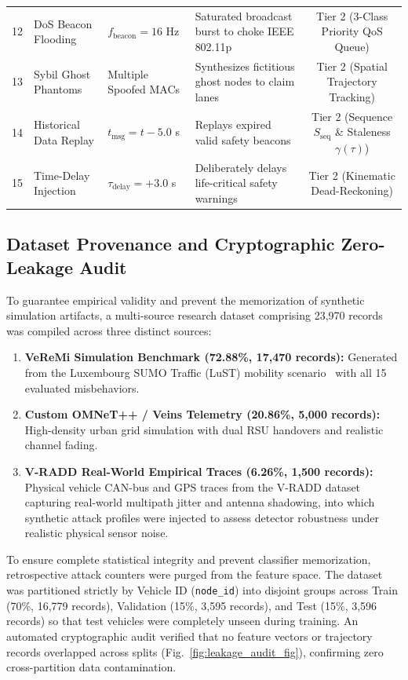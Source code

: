 \documentclass[conference]{IEEEtran}
\begin{document}
\begin{table}[t]
{\begin{tabular}{clp{3.8cm}p{6.0cm}c}
12 & DoS Beacon Flooding & $f_{\text{beacon}} = 16$ Hz & Saturated broadcast burst to choke IEEE 802.11p & Tier 2 (3-Class Priority QoS Queue) \\
13 & Sybil Ghost Phantoms & Multiple Spoofed MACs & Synthesizes fictitious ghost nodes to claim lanes & Tier 2 (Spatial Trajectory Tracking) \\
14 & Historical Data Replay & $t_{\text{msg}} = t - 5.0$ s & Replays expired valid safety beacons & Tier 2 (Sequence $S_{\text{seq}}$ \& Staleness $\gamma(\tau)$) \\
15 & Time-Delay Injection & $\tau_{\text{delay}} = +3.0$ s & Deliberately delays life-critical safety warnings & Tier 2 (Kinematic Dead-Reckoning) \\
\bottomrule
\end{tabular}%
}
\end{table}

\subsection{Dataset Provenance and Cryptographic Zero-Leakage Audit}

To guarantee empirical validity and prevent the memorization of synthetic simulation artifacts, a multi-source research dataset comprising 23,970 records was compiled across three distinct sources:
\begin{enumerate}
    \item \textbf{VeReMi Simulation Benchmark (72.88\%, 17,470 records):} Generated from the Luxembourg SUMO Traffic (LuST) mobility scenario~\cite{codeca2015lust} with all 15 evaluated misbehaviors.
    \item \textbf{Custom OMNeT++ / Veins Telemetry (20.86\%, 5,000 records):} High-density urban grid simulation with dual RSU handovers and realistic channel fading.
    \item \textbf{V-RADD Real-World Empirical Traces (6.26\%, 1,500 records):} Physical vehicle CAN-bus and GPS traces from the V-RADD dataset~\cite{vradd} capturing real-world multipath jitter and antenna shadowing, into which synthetic attack profiles were injected to assess detector robustness under realistic physical sensor noise.
\end{enumerate}

To ensure complete statistical integrity and prevent classifier memorization, retrospective attack counters were purged from the feature space. The dataset was partitioned strictly by Vehicle ID (\texttt{node\_id}) into disjoint groups across Train (70\%, 16,779 records), Validation (15\%, 3,595 records), and Test (15\%, 3,596 records) so that test vehicles were completely unseen during training. An automated cryptographic audit verified that no feature vectors or trajectory records overlapped across splits (Fig.~\ref{fig:leakage_audit_fig}), confirming zero cross-partition data contamination.
\end{document}
